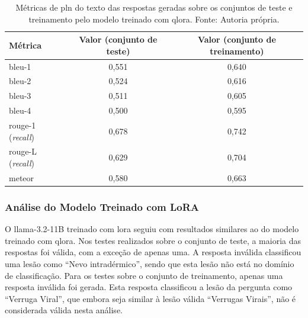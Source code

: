 \begin{table}[ht]
    \centering
    \begin{tabular}{l|c|c}
        \hline
        Métrica                        & Valor (conjunto de teste) & Valor (conjunto de treinamento) \\ \hline
        \ac{bleu}-1                    & 0,551                     & 0,640                           \\
        \ac{bleu}-2                    & 0,524                     & 0,616                           \\
        \ac{bleu}-3                    & 0,511                     & 0,605                           \\
        \ac{bleu}-4                    & 0,500                     & 0,595                           \\
        \hline
        \ac{rouge}-1 (\textit{recall}) & 0,678                     & 0,742                           \\
        \ac{rouge}-L (\textit{recall}) & 0,629                     & 0,704                           \\
        \hline
        \ac{meteor}                    & 0,580                     & 0,663                           \\
        \hline
    \end{tabular}
    \label{tab:lladerm_qlora_nlp_metrics}
    \caption{Métricas de \ac{pln} do texto das respostas geradas sobre os conjuntos de teste e treinamento pelo
    modelo treinado com \ac{qlora}. Fonte: Autoria própria.}
\end{table}

\subsubsection{Análise do Modelo Treinado com LoRA}

O \ac{llama}-3.2-11B treinado com \ac{lora} seguiu com resultados similares ao do modelo treinado com \ac{qlora}. Nos
testes realizados sobre o conjunto de teste, a maioria das respostas foi válida, com a exceção de apenas uma. A
resposta inválida classificou uma lesão como ``Nevo intradérmico'', sendo que esta lesão não está no domínio de
classificação. Para os testes sobre o conjunto de treinamento, apenas uma resposta inválida foi gerada. Esta
resposta classificou a lesão da pergunta como ``Verruga Viral'', que embora seja similar à lesão válida ``Verrugas
Virais'', não é considerada válida nesta análise.

